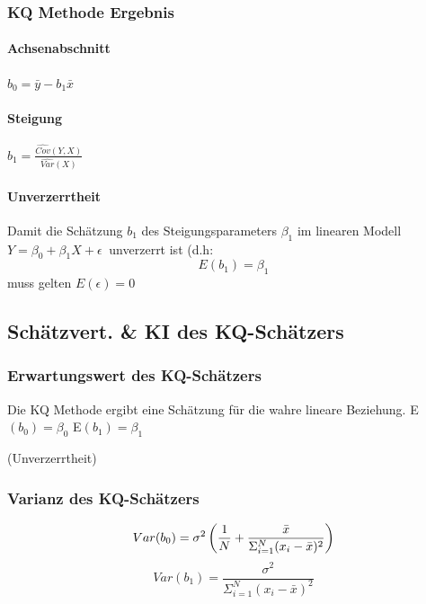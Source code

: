 \documentclass[a3paper, 8pt]{extarticle}
\begin{document}
\begin{multicols*}{5}
\subsubsection{KQ Methode Ergebnis}
\paragraph{Achsenabschnitt} $b_0 = \bar{y}-b_1\bar{x}$

\paragraph{Steigung}
$b_1 =\frac{\widehat{Cov}(Y,X)}{\widehat{Var}(X)}$

\paragraph{Unverzerrtheit} Damit die Schätzung $b_1$ des Steigungsparameters $\beta_1$ im linearen Modell $Y=\beta_0+\beta_1X+\epsilon\ $ unverzerrt ist (d.h: $$E(b_1)=\beta_1$$ muss gelten $E(\epsilon)=0$ 

\subsection{Schätzvert. \& KI des KQ-Schätzers}
\subsubsection{Erwartungswert des KQ-Schätzers}
Die KQ Methode ergibt eine Schätzung für die wahre lineare Beziehung.
E$(b_0)= \beta_0$
E$(b_1) = \beta_1$

(Unverzerrtheit)

\subsubsection{Varianz des KQ-Schätzers} 

$$Var(b_0)=\sigma^2 \left( \frac{1}{N}+\frac{\Bar{x}}{\Sigma_{i=1}^N(x_i-\Bar{x})^2}\right)$$
$$Var(b_1)=\frac{\sigma^2}{\Sigma_{i=1}^N(x_i-\bar{x})^2}$$


\end{multicols*}
\end{document}
